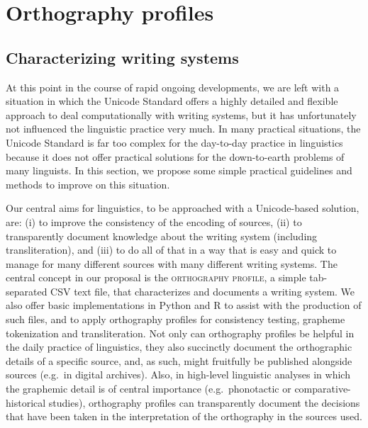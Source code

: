 \section{Orthography profiles}\label{orthography-profiles}

\subsection{Characterizing writing systems}\label{characterizing-writing-systems}

At this point in the course of rapid ongoing developments, we are left with a situation in which the Unicode Standard offers a highly detailed and flexible approach to deal computationally with writing systems, but it has unfortunately not influenced the linguistic practice very much. In many practical situations, the Unicode Standard is far too complex for the day-to-day practice in linguistics because it does not offer practical solutions for the down-to-earth problems of many linguists. In this section, we propose some simple practical guidelines and methods to improve on this situation.

Our central aims for linguistics, to be approached with a Unicode-based solution, are: (i) to improve the consistency of the encoding of sources, (ii) to transparently document knowledge about the writing system (including transliteration), and (iii) to do all of that in a way that is easy and quick to manage for many different sources with many different writing systems. The central concept in our proposal is the \textsc{orthography profile}, a simple tab-separated CSV text file, that characterizes and documents a writing system. We also offer basic implementations in Python and R to assist with the production of such files, and to apply orthography profiles for consistency testing, grapheme tokenization and transliteration. Not only can orthography profiles be helpful in the daily practice of linguistics, they also succinctly document the orthographic details of a specific source, and, as such, might fruitfully be published alongside sources (e.g.~in digital archives). Also, in high-level linguistic analyses in which the graphemic detail is of central importance (e.g.~phonotactic or comparative-historical studies), orthography profiles can transparently document the decisions that have been taken in the interpretation of the orthography in the sources used.

